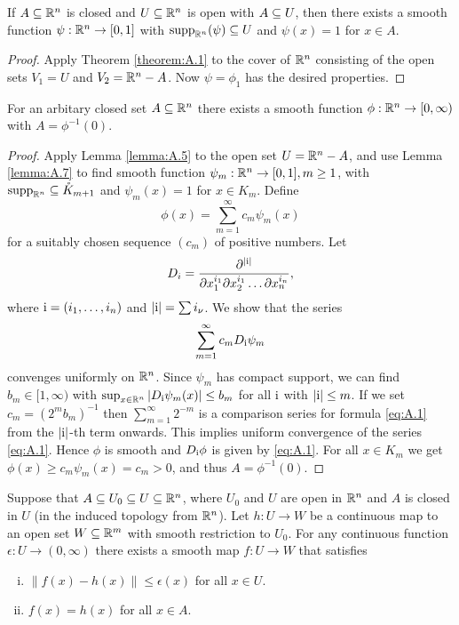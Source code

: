 \begin{lemma}\label{lemma:A.7}
  If $A\subseteq{\ensuremath{\mathbb{R}}}^n$ is closed and $U\subseteq{\ensuremath{\mathbb{R}}}^n$ is open with $A\subseteq U$, then there exists 
  a smooth function $\psi:{\mathbb{R}}^n\to [0, 1]$ with $\operatorname{supp}_{{\mathbb{R}}^n}(\psi)\subseteq U$ and $\psi(x)=1$
  for $x\in A$.
\end{lemma}

\begin{proof}
  Apply Theorem \ref{theorem:A.1} to the cover of ${\mathbb{R}}^n$ consisting of the open sets $V_1=U$
and $V_2 = {\mathbb{R}}^n - A$. Now $\psi = \phi_1$ has the desired properties.
\end{proof}

\begin{proposition}[Whitney]\label{proposition:A.8}
  For an arbitary closed set $A\subseteq{\ensuremath{\mathbb{R}}}^n$ there exists a smooth function $\phi:{\mathbb{R}}^n\to[0, \infty)$ with $A=\phi^{-1}(0)$.
\end{proposition}

\begin{proof}
  Apply Lemma \ref{lemma:A.5} to the open set $U={\mathbb{R}}^n-A$, and use Lemma \ref{lemma:A.7} to find smooth 
  function $\psi_m:{\mathbb{R}}^n\to[0, 1], m\ge 1$, with $\operatorname{supp}_{{\mathbb{R}}^n}\subseteq\mathring{K}_{m+1}$ and $\psi_m(x)=1$ for $x\in K_m$.
  Define 
  \[
    \phi(x) = \sum_{m=1}^\infty c_m\psi_m(x)
  \]
  for a suitably chosen sequence $(c_m)$ of positive numbers. Let
  \[
    D_i = \frac{\partial^{|\mathrm{i}|}}{\partial x_1^{i_1}\partial x_2^{i_1}\ldots\partial x_n^{i_n}},
  \]
  where $\mathrm{i} = (i_1, \ldots, i_n)$ and $|\mathrm{i}| = \sum i_\nu$. We show that the series 
  \begin{align}\label{eq:A.1}
    \sum_{m=1}^\infty c_mD_{\mathrm{i}}\psi_m
  \end{align}
  convenges uniformly on ${\mathbb{R}}^n$. Since $\psi_m$ has compact support, we can find $b_m\in [1, \infty)$
  with $\sup_{x\in{\ensuremath{\mathbb{R}}}^n}|D_{\mathrm{i}}\psi_m(x)|\le b_m$ for all $\mathrm{i}$ with $|\mathrm{i}|\le m$. If we set 
  $c_m = (2^m b_m)^{-1}$ then $\sum_{m=1}^\infty 2^{-m}$ is a comparison series for formula \eqref{eq:A.1} from 
  the $|\mathrm{i}|$-th term onwards. This implies uniform convergence of the series \eqref{eq:A.1}. Hence $\phi$ is
  smooth and $D_{\mathrm{i}}\phi$ is given by \eqref{eq:A.1}. For all $x\in K_m$ we get $\phi(x)\ge c_m\psi_m(x)=c_m> 0$, 
  and thus $A = \phi^{-1}(0)$.
\end{proof}


\begin{lemma}\label{lemma:A.9}
  Suppose that $A\subseteq U_0\subseteq U\subseteq {\ensuremath{\mathbb{R}}}^n$, where $U_0$ and $U$ are open in
${\mathbb{R}}^n$ and $A$ is closed in $U$ (in the induced topology from ${\mathbb{R}}^n$). Let $h:U\to W$ be
a continuous map to an open set $W\subseteq{\ensuremath{\mathbb{R}}}^m$ with smooth restriction to $U_0$. For
any continuous function $\epsilon:U\to (0, \infty)$ there exists a smooth map $f:U\to W$ that
satisfies
\begin{enumerate}[(i)]
  \item $\|f(x)-h(x)\|\le \epsilon(x)$ for all $x\in U$.
  \item $f(x) = h(x)$ for all $x\in A$.
\end{enumerate}
\end{lemma}

